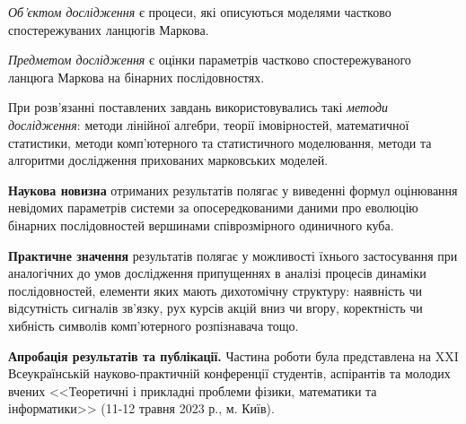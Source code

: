 \emph{Об'єктом дослідження} є процеси, які описуються моделями частково спостережуваних ланцюгів Маркова.

\emph{Предметом дослідження} є оцінки параметрів частково спостережуваного ланцюга Маркова на бінарних послідовностях.

При розв’язанні поставлених завдань використовувались такі \emph{методи дослідження}: методи лінійної  алгебри, теорії імовірностей, математичної статистики, методи комп’ютерного та статистичного моделювання, методи та алгоритми дослідження прихованих марковських моделей.

\textbf{Наукова новизна} отриманих результатів полягає у виведенні формул оцінювання невідомих параметрів системи за опосередкованими даними про еволюцію бінарних послідовностей вершинами співрозмірного одиничного куба.  

\textbf{Практичне значення} результатів полягає у можливості їхнього застосування при аналогічних до умов дослідження припущеннях в аналізі процесів динаміки послідовностей, елементи яких мають дихотомічну структуру: наявність чи відсутність сигналів зв'язку, рух курсів акцій вниз чи вгору, коректність чи хибність символів комп'ютерного розпізнавача тощо.

\textbf{Апробація результатів та публікації.} Частина роботи була представлена на XXI Всеукраїнській науково-практичній конференції студентів, аспірантів та молодих вчених <<Теоретичні і прикладні проблеми фізики, математики та інформатики>> (11-12 травня 2023 р., м. Київ).